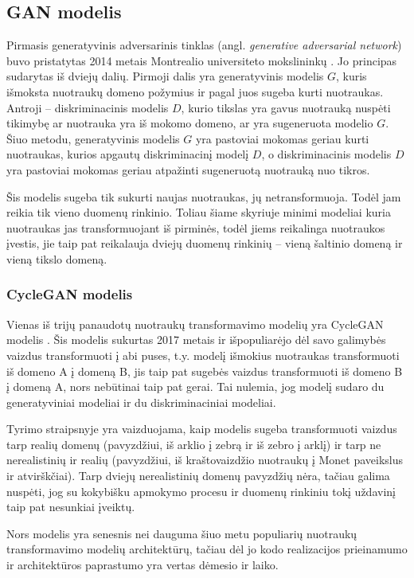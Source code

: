 \documentclass{VUMIFPSbakalaurinis}
\begin{document}
    \subsection{GAN modelis}
        Pirmasis generatyvinis adversarinis tinklas (angl. \emph{generative adversarial network}) buvo pristatytas 2014 metais Montrealio universiteto mokslininkų \cite{OrigGan}. Jo principas sudarytas iš dviejų dalių. Pirmoji dalis yra generatyvinis modelis $G$, kuris išmoksta nuotraukų domeno požymius ir pagal juos sugeba kurti nuotraukas. Antroji – diskriminacinis modelis $D$, kurio tikslas yra gavus nuotrauką nuspėti tikimybę ar nuotrauka yra iš mokomo domeno, ar yra sugeneruota modelio $G$. Šiuo metodu, generatyvinis modelis $G$ yra pastoviai mokomas geriau kurti nuotraukas, kurios apgautų diskriminacinį modelį $D$, o diskriminacinis modelis $D$ yra pastoviai mokomas geriau atpažinti sugeneruotą nuotrauką nuo tikros.

        Šis modelis sugeba tik sukurti naujas nuotraukas, jų netransformuoja. Todėl jam reikia tik vieno duomenų rinkinio. Toliau šiame skyriuje minimi modeliai kuria nuotraukas jas transformuojant iš pirminės, todėl jiems reikalinga nuotraukos įvestis, jie taip pat reikalauja dviejų duomenų rinkinių – vieną šaltinio domeną ir vieną tikslo domeną.
        \subsubsection{CycleGAN modelis}
            Vienas iš trijų panaudotų nuotraukų transformavimo modelių yra CycleGAN modelis \cite{CycleGAN2017}. Šis modelis sukurtas 2017 metais ir išpopuliarėjo dėl savo galimybės vaizdus transformuoti į abi puses, t.y. modelį išmokius nuotraukas transformuoti iš domeno A į domeną B, jis taip pat sugebės vaizdus transformuoti iš domeno B į domeną A, nors nebūtinai taip pat gerai. Tai nulemia, jog modelį sudaro du generatyviniai modeliai ir du diskriminaciniai modeliai.
    
            Tyrimo straipsnyje yra vaizduojama, kaip modelis sugeba transformuoti vaizdus tarp realių domenų (pavyzdžiui, iš arklio į zebrą ir iš zebro į arklį) ir tarp ne nerealistinių ir realių (pavyzdžiui, iš kraštovaizdžio nuotraukų į Monet paveikslus ir atvirškčiai). Tarp dviejų nerealistinių domenų pavyzdžių nėra, tačiau galima nuspėti, jog su kokybišku apmokymo procesu ir duomenų rinkiniu tokį uždavinį taip pat nesunkiai įveiktų.
    
            Nors modelis yra senesnis nei dauguma šiuo metu populiarių nuotraukų transformavimo modelių architektūrų, tačiau dėl jo kodo realizacijos prieinamumo ir architektūros paprastumo yra vertas dėmesio ir laiko.
            
\end{document}
